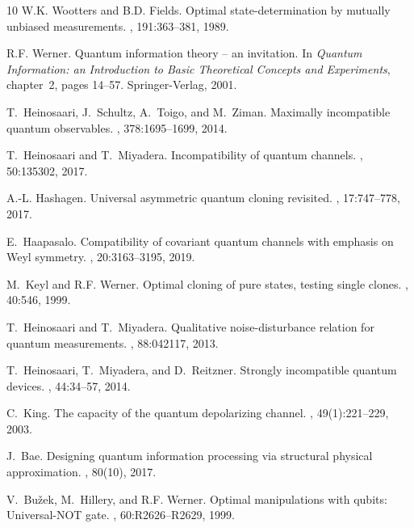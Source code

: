 \documentclass[12pt,reqno]{amsart}
\theoremstyle{definition}
\begin{document}
\begin{thebibliography}{10}
W.K. Wootters and B.D. Fields.
\newblock Optimal state-determination by mutually unbiased measurements.
, 191:363--381, 1989.

R.F. Werner.
\newblock Quantum information theory -- an invitation.
\newblock In {\em Quantum Information: an Introduction to Basic Theoretical
  Concepts and Experiments}, chapter~2, pages 14--57. Springer-Verlag, 2001.

T.~Heinosaari, J.~Schultz, A.~Toigo, and M.~Ziman.
\newblock Maximally incompatible quantum observables.
, 378:1695--1699, 2014.

T.~Heinosaari and T.~Miyadera.
\newblock Incompatibility of quantum channels.
, 50:135302, 2017.

A.-L. Hashagen.
\newblock Universal asymmetric quantum cloning revisited.
, 17:747--778, 2017.

E.~Haapasalo.
\newblock Compatibility of covariant quantum channels with emphasis on {W}eyl
  symmetry.
, 20:3163--3195, 2019.

M.~Keyl and R.F. Werner.
\newblock Optimal cloning of pure states, testing single clones.
, 40:546, 1999.

T.~Heinosaari and T.~Miyadera.
\newblock Qualitative noise-disturbance relation for quantum measurements.
, 88:042117, 2013.

T.~Heinosaari, T.~Miyadera, and D.~Reitzner.
\newblock Strongly incompatible quantum devices.
, 44:34--57, 2014.

C.~King.
\newblock The capacity of the quantum depolarizing channel.
, 49(1):221--229, 2003.

J.~Bae.
\newblock Designing quantum information processing via structural physical
  approximation.
, 80(10), 2017.

V.~Bu\v{z}ek, M.~Hillery, and R.F. Werner.
\newblock Optimal manipulations with qubits: {U}niversal-{NOT} gate.
, 60:R2626--R2629, 1999.


\end{thebibliography}
\end{document}
